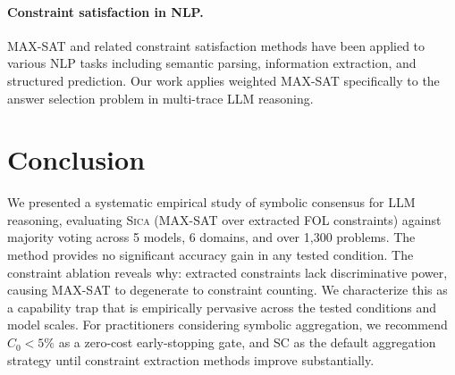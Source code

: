 \documentclass[11pt,a4paper]{article}
\newcommand{\sica}{\textsc{Sica}}
\newcommand{\czero}{C_0}
\begin{document}
\paragraph{Constraint satisfaction in NLP.}
MAX-SAT and related constraint satisfaction methods have been applied to various NLP tasks including semantic parsing, information extraction, and structured prediction. Our work applies weighted MAX-SAT specifically to the answer selection problem in multi-trace LLM reasoning.

\section{Conclusion}

We presented a systematic empirical study of symbolic consensus for LLM reasoning, evaluating \sica{} (MAX-SAT over extracted FOL constraints) against majority voting across 5 models, 6 domains, and over 1,300 problems. The method provides no significant accuracy gain in any tested condition. The constraint ablation reveals why: extracted constraints lack discriminative power, causing MAX-SAT to degenerate to constraint counting. We characterize this as a capability trap that is empirically pervasive across the tested conditions and model scales. For practitioners considering symbolic aggregation, we recommend $\czero < 5\%$ as a zero-cost early-stopping gate, and SC as the default aggregation strategy until constraint extraction methods improve substantially.
\end{document}
